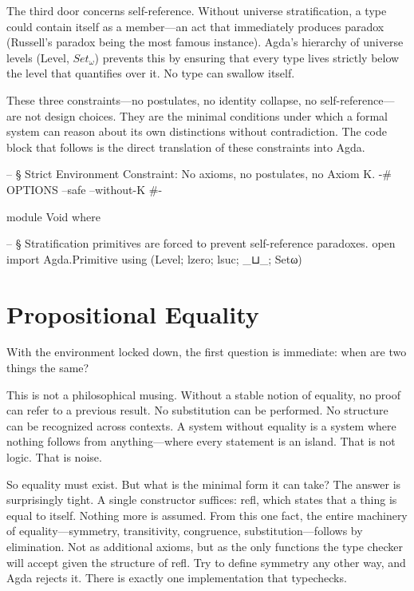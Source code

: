 \documentclass[11pt,a4paper]{book}
\def\texttt#1{#1}%
\begin{document}
The third door concerns self-reference. Without universe stratification, a type could contain itself as a member—an act that immediately produces paradox (Russell's paradox being the most famous instance). Agda's hierarchy of universe levels (\texttt{Level}, $\mathit{Set}_\omega$) prevents this by ensuring that every type lives strictly below the level that quantifies over it. No type can swallow itself.

These three constraints—no postulates, no identity collapse, no self-reference—are not design choices. They are the minimal conditions under which a formal system can reason about its own distinctions without contradiction. The code block that follows is the direct translation of these constraints into Agda.

\begin{code}
-- § Strict Environment Constraint: No axioms, no postulates, no Axiom K.
{-# OPTIONS --safe --without-K #-}

module Void where

-- § Stratification primitives are forced to prevent self-reference paradoxes.
open import Agda.Primitive using (Level; lzero; lsuc; _⊔_; Setω)
\end{code}

\section{Propositional Equality}

With the environment locked down, the first question is immediate: when are two things the same?

This is not a philosophical musing. Without a stable notion of equality, no proof can refer to a previous result. No substitution can be performed. No structure can be recognized across contexts. A system without equality is a system where nothing follows from anything—where every statement is an island. That is not logic. That is noise.

So equality must exist. But what is the minimal form it can take? The answer is surprisingly tight. A single constructor suffices: \texttt{refl}, which states that a thing is equal to itself. Nothing more is assumed. From this one fact, the entire machinery of equality—symmetry, transitivity, congruence, substitution—follows by elimination. Not as additional axioms, but as the only functions the type checker will accept given the structure of \texttt{refl}. Try to define symmetry any other way, and Agda rejects it. There is exactly one implementation that typechecks.
\end{document}
